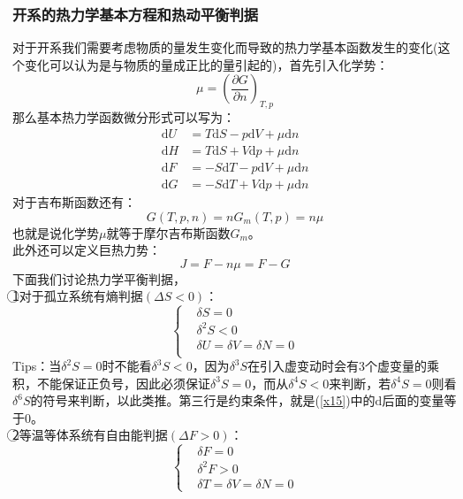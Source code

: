 \documentclass[12pt]{article}
\begin{document}
\subsubsection{开系的热力学基本方程和热动平衡判据}
\noindent
对于开系我们需要考虑物质的量发生变化而导致的热力学基本函数发生的变化(这个变化可以认为是与物质的量成正比的量引起的)，首先引入化学势：
\begin{equation}
	\mu =(\frac{\partial G}{\partial n})_{T,p}
\end{equation}
那么基本热力学函数微分形式可以写为：
\begin{equation}
	\begin{split}
		\mathrm{d}U&=T\mathrm{d}S-p\mathrm{d}V+\mu\mathrm{d}n\\
		\mathrm{d}H&=T\mathrm{d}S+V\mathrm{d}p+\mu\mathrm{d}n\\
		\mathrm{d}F&=-S\mathrm{d}T-p\mathrm{d}V+\mu\mathrm{d}n\\
		\mathrm{d}G&=-S\mathrm{d}T+V\mathrm{d}p+\mu\mathrm{d}n
	\end{split}
\label{x15}
\end{equation}	
对于吉布斯函数还有：
\begin{equation}
	G(T,p,n)=nG_m(T,p)=n\mu
\end{equation}
也就是说化学势$\mu$就等于摩尔吉布斯函数$G_m$。\\
此外还可以定义巨热力势：
\begin{equation}
	J=F-n\mu=F-G
\end{equation}
下面我们讨论热力学平衡判据，\\
\textcircled{1}对于孤立系统有熵判据$(\Delta S<0)$：
\begin{equation}
\left\{ \begin{split}
	&\delta S=0  \\
	&{{\delta }^{2}}S<0  \\
	&\delta U=\delta V=\delta N=0  \\
\end{split} \right.
\end{equation}
Tips：当$\delta^2S=0$时不能看$\delta^3S<0$，因为$\delta^3S$在引入虚变动时会有3个虚变量的乘积，不能保证正负号，因此必须保证$\delta^3S=0$，而从$\delta^4S<0$来判断，若$\delta^4S=0$则看$\delta^6S$的符号来判断，以此类推。第三行是约束条件，就是(\ref{x15})中的$\mathrm{d}$后面的变量等于0。\\
\textcircled{2}等温等体系统有自由能判据$(\Delta F>0)$：
\begin{equation}
	\left \{\begin{split}
		&\delta F=0\\
		&\delta^2F>0\\
		&\delta T=\delta V=\delta N=0
	\end{split}
\right.
\end{equation}
\end{document}
